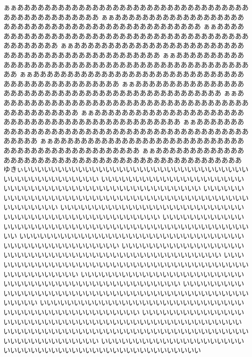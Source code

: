ぁぁああああああああああああああああああああああああああああああああああああああああああああああああ
ぁぁああああああああああああああああああああああああああああああああああああああああああああああああ
ぁぁああああああああああああああああああああああああああああああああああああああああああああああああ
ぁぁああああああああああああああああああああああああああああああああああああああああああああああああ
ぁぁああああああああああああああああああああああああああああああああああああああああああああああああ
ぁぁああああああああああああああああああああああああああああああああああああああああああああああああ
ぁぁああああああああああああああああああああああああああああああああああああああああああああああああ
ぁぁああああああああああああああああああああああああああああああああああああああああああああああああ
ぁぁああああああああああああああああああああああああああああああああああああああああああああああああ
ぁぁああああああああああああああああああああああああああああああああああああああああああああああああ
ぁぁああああああああああああああああああああああああああああああああああああああああああああああああ
ぁぁああああああああああああああああああああああああああああああああああああああああああああああああ
ゆきぃいいいいいいいいいいいいいいいいいいいいいいいいいいいいいいいいいいいいいいいいいいいいいいい
いいいいいいいいいいいいいいいいいいいいいいいいいいいいいいいいいいいいいいいいいいいいいいいいいい
いいいいいいいいいいいいいいいいいいいいいいいいいいいいいいいいいいいいいいいいいいいいいいいいいい
いいいいいいいいいいいいいいいいいいいいいいいいいいいいいいいいいいいいいいいいいいいいいいいいいい
いいいいいいいいいいいいいいいいいいいいいいいいいいいいいいいいいいいいいいいいいいいいいいいいいい
いいいいいいいいいいいいいいいいいいいいいいいいいいいいいいいいいいいいいいいいいいいいいいいいいい
いいいいいいいいいいいいいいいいいいいいいいいいいいいいいいいいいいいいいいいいいいいいいいいいいい
いいいいいいいいいいいいいいいいいいいいいいいいいいいいいいいいいいいいいいいいいいいいいいいいいい
いいいいいいいいいいいいいいいいいいいいいいいいいいいいいいいいいいいいいいいいいいいいいいいいいい
いいいいいいいいいいいいいいいいいいいいいいいいいいいいいいいいいいいいいいいいいいいいいいいいいい
いいいいいいいいいいいいいいいいいいいいいいいいいいいいいいいいいいいいいいいいいいいいいいいいいい
いいいいいいいいいいいいいいいいいいいいいいいいいいいいいいいいいいいいいいいいいいいいいいいいいい
いいいいいいいいいいいいいいいいいいいいいいいいいいいいいいいいいいいいいいいいいいいいいいいいいい
いいいいいいいいいいいいいいいいいいいいいいいいいいいいいいいいいいいいいいいいいいいいいいいいいい
